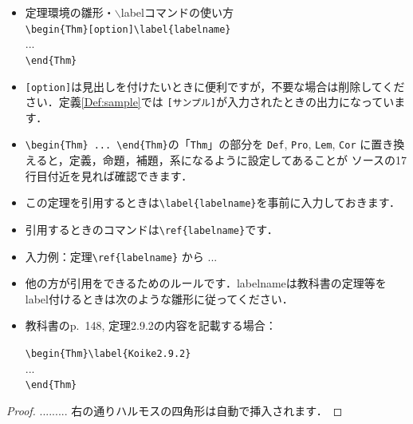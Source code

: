 \documentclass[12pt,a4j,final]{jreport}
\theoremstyle{definition}
\newtheorem{Thm}{定理}[section]
\begin{document}
\begin{screen}
\begin{itemize}
\item 定理環境の雛形・$\backslash$labelコマンドの使い方\\
\verb|\begin{Thm}[option]\label{labelname}|\\
...\\
\verb|\end{Thm}|\\
\item \verb|[option]|は見出しを付けたいときに便利ですが，不要な場合は削除してください．定義\ref{Def:sample}では
\verb|[サンプル]|が入力されたときの出力になっています．
\item \verb|\begin{Thm} ... \end{Thm}|の「\verb|Thm|」の部分を
\verb|Def|, \verb|Pro|, \verb|Lem|, \verb|Cor|
に置き換えると，定義，命題，補題，系になるように設定してあることが
ソースの17行目付近を見れば確認できます．
\item この定理を引用するときは\verb|\label{labelname}|を事前に入力しておきます．
\item 引用するときのコマンドは\verb|\ref{labelname}|です．
\item[] 入力例：定理\verb|\ref{labelname}| から ...
\item 他の方が引用をできるためのルールです．labelnameは教科書の定理等をlabel付けるときは次のような雛形に従ってください．
\item 教科書\cite{Koike}のp.~148, 定理2.9.2の内容を記載する場合：
\begin{screen}
\verb|\begin{Thm}\label{Koike2.9.2}|\\
...\\
\verb|\end{Thm}|\\

\end{screen}
\end{itemize}
\end{screen}

\begin{proof}
.........
右の通りハルモスの四角形は自動で挿入されます．
\end{proof}
\end{document}
